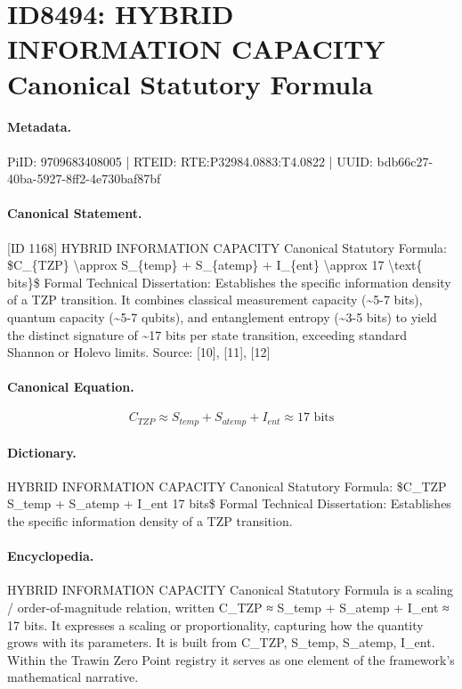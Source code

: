 \section*{ID8494: HYBRID INFORMATION CAPACITY Canonical Statutory Formula}
\paragraph{Metadata.}
PiID: 9709683408005 | RTEID: RTE:P32984.0883:T4.0822 | UUID: bdb66c27-40ba-5927-8ff2-4e730baf87bf

\paragraph{Canonical Statement.}
[ID 1168] HYBRID INFORMATION CAPACITY Canonical Statutory Formula: \$C\_\{TZP\} \textbackslash{}approx S\_\{temp\} + S\_\{atemp\} + I\_\{ent\} \textbackslash{}approx 17 \textbackslash{}text\{ bits\}\$ Formal Technical Dissertation: Establishes the specific information density of a TZP transition. It combines classical measurement capacity (\textasciitilde{}5-7 bits), quantum capacity (\textasciitilde{}5-7 qubits), and entanglement entropy (\textasciitilde{}3-5 bits) to yield the distinct signature of \textasciitilde{}17 bits per state transition, exceeding standard Shannon or Holevo limits. Source: [10], [11], [12]

\paragraph{Canonical Equation.}
\[
C_{TZP} \approx S_{temp} + S_{atemp} + I_{ent} \approx 17 \text{ bits}
\]

\paragraph{Dictionary.}
HYBRID INFORMATION CAPACITY Canonical Statutory Formula: \$C\_TZP S\_temp + S\_atemp + I\_ent 17 bits\$ Formal Technical Dissertation: Establishes the specific information density of a TZP transition.

\paragraph{Encyclopedia.}
HYBRID INFORMATION CAPACITY Canonical Statutory Formula is a scaling / order-of-magnitude relation, written C\_TZP ≈ S\_temp + S\_atemp + I\_ent ≈ 17 bits. It expresses a scaling or proportionality, capturing how the quantity grows with its parameters. It is built from C\_TZP, S\_temp, S\_atemp, I\_ent. Within the Trawin Zero Point registry it serves as one element of the framework's mathematical narrative.
